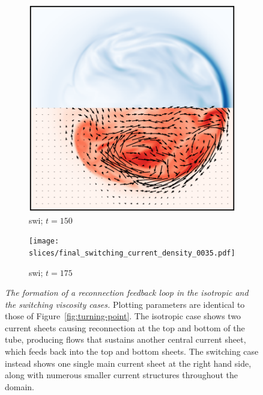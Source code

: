 \begin{figure}[t]
\begin{subfigure}[t]{0.32\textwidth}
    \includegraphics[width=\linewidth]{slices/final_switching_current_density_0030.pdf}
    \caption{swi; $t=150$}
    \label{fig:final_switching_current_density_0030}
  \end{subfigure}
  \hfill
  \begin{subfigure}[t]{0.32\textwidth}
    \centering
    \texttt{[image: slices/final\_switching\_current\_density\_0035.pdf]}
    \caption{swi; $t=175$}
    \label{fig:final_switching_current_density_0035}
  \end{subfigure}
  \caption{\textit{The formation of a reconnection feedback loop in the isotropic and the switching viscosity cases.} Plotting parameters are identical to those of Figure~\ref{fig:turning-point}. The isotropic case shows two current sheets causing reconnection at the top and bottom of the tube, producing flows that sustains another central current sheet, which feeds back into the top and bottom sheets. The switching case instead shows one single main current sheet at the right hand side, along with numerous smaller current structures throughout the domain.}
  \label{fig:feedback-reconnection}
\end{figure}

